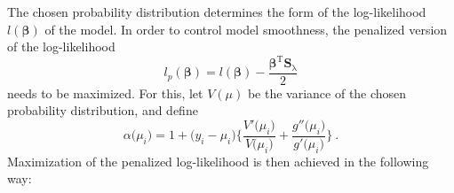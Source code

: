 The chosen probability distribution determines the form of the log-likelihood \(l(\symbf{\beta})\) of the model.  In order to control model smoothness, the penalized version of the log-likelihood
\begin{equation}
  \label{eq:SCAMPenalizedLogLikelihood}
  l_p(\symbf{\beta}) = l(\symbf{\beta}) - \frac{\symbf{\beta}^{\text{T}} \symbf{S}_\uplambda}{2}
\end{equation}
needs to be maximized.  For this, let \(V(\mu)\) be the variance of the chosen probability distribution, and define
\begin{equation}
  \label{eq:SCAMVarianceAlpha}
  \alpha \bigl(\mu_i\bigr) = 1 + \bigl(y_i - \mu_i\bigr)\Biggl\{\frac{V'\bigl(\mu_i\bigr)}{V\bigl(\mu_i\bigr)} + \frac{g''\bigl(\mu_i\bigr)}{g'\bigl(\mu_i\bigr)}\Biggr\}~.
\end{equation}
Maximization of the penalized log-likelihood is then achieved in the following way:

